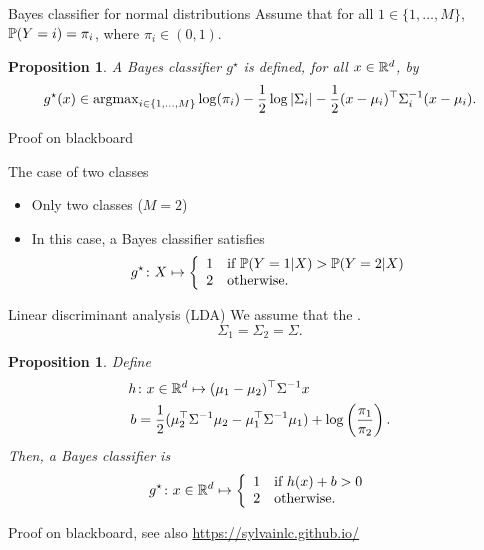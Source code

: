 \documentclass[xcolor={usenames,dvipsnames},handout]{beamer}
\newtheorem{prop}[theorem]{Proposition}
\begin{document}
\begin{frame}{Bayes classifier for normal distributions}
Assume that for all $1\in\{1,\ldots,M\}$, \alert{$\P(Y= i) = \pi_i$, where $\pi_i\in(0,1)$}.

\vspace{.2cm}

	\begin{prop}
		A Bayes classifier $g^\star$ is defined, for all $x \in \R^d$, by
		\pause
		$$
			g^\star(x) \in \argmax_{i \in \{1,\ldots,M\}} \log(\pi_i) - \frac 12 \log |\Sigma_i| - \frac 12 (x-\mu_i)^\top \Sigma_i^{-1} (x-\mu_i).
		$$
	\end{prop}

\vspace{.3cm}

\centering
{\color{Vert} Proof on blackboard}

\end{frame}


\begin{frame}{The case of two classes}
	\begin{itemize}
	\item  Only two classes ($M=2$) 
	\item In this case, a Bayes classifier satisfies
	$$
		g^\star \colon X  \mapsto
		\left\{ \begin{array}{ll}
			1 & \text{if }\P (Y=1 | X) >\P(Y=2 | X) \\
			2 & \text{otherwise}.
		\end{array} \right.
	$$
	\end{itemize}
\end{frame}


\begin{frame}{Linear discriminant analysis (LDA)}
	We assume that the .
	$$
		\Sigma_1 = \Sigma_2 = \Sigma.
	$$

	
	\begin{prop}
		Define 
		\begin{align*}
			h &\colon x \in \R^d \mapsto (\mu_1-\mu_2)^\top\Sigma^{-1}x \\
			b &= \frac 12 (\mu_2^\top\Sigma^{-1}\mu_2 - \mu_1^\top\Sigma^{-1}\mu_1) + \log \left( \frac{\pi_1}{\pi_2} \right).
		\end{align*}
		Then, a Bayes classifier is
		$$
			g^\star \colon x \in \R^d \mapsto
			\left\{ \begin{array}{ll}
				1 & \text{if } h(x) + b > 0 \\
				2 & \text{otherwise}.
			\end{array} \right.
		$$
	\end{prop}

\centering
{\color{Vert} Proof on blackboard, see also \url{https://sylvainlc.github.io/}}

\end{frame}
\end{document}
